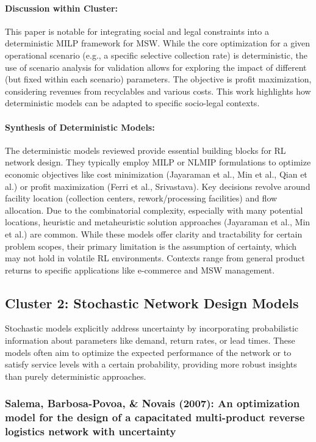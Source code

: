 \paragraph{Discussion within Cluster:} This paper is notable for integrating social and legal constraints into a deterministic MILP framework for MSW. While the core optimization for a given operational scenario (e.g., a specific selective collection rate) is deterministic, the use of scenario analysis for validation allows for exploring the impact of different (but fixed within each scenario) parameters. The objective is profit maximization, considering revenues from recyclables and various costs. This work highlights how deterministic models can be adapted to specific socio-legal contexts.

\paragraph{Synthesis of Deterministic Models:}
The deterministic models reviewed provide essential building blocks for RL network design. They typically employ MILP or NLMIP formulations to optimize economic objectives like cost minimization (Jayaraman et al., Min et al., Qian et al.) or profit maximization (Ferri et al., Srivastava). Key decisions revolve around facility location (collection centers, rework/processing facilities) and flow allocation. Due to the combinatorial complexity, especially with many potential locations, heuristic and metaheuristic solution approaches (Jayaraman et al., Min et al.) are common. While these models offer clarity and tractability for certain problem scopes, their primary limitation is the assumption of certainty, which may not hold in volatile RL environments. Contexts range from general product returns to specific applications like e-commerce and MSW management.

\subsection{Cluster 2: Stochastic Network Design Models}
Stochastic models explicitly address uncertainty by incorporating probabilistic information about parameters like demand, return rates, or lead times. These models often aim to optimize the expected performance of the network or to satisfy service levels with a certain probability, providing more robust insights than purely deterministic approaches.

\subsubsection{Salema, Barbosa-Povoa, \& Novais (2007): An optimization model for the design of a capacitated multi-product reverse logistics network with uncertainty}
